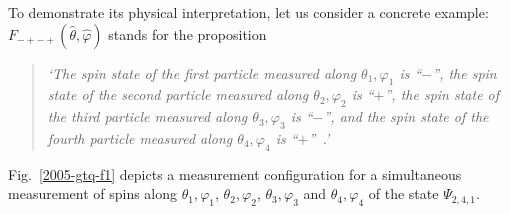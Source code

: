 \documentclass[pra,amsfonts,showpacs,showkeys,preprint]{revtex4}
\begin{document}
To demonstrate its physical interpretation, let us consider a concrete example: $F_{- + - + } ({\hat \theta},{\hat \varphi} )$ stands for the proposition
\begin{quote}
{\em `The spin state of the first particle measured along $\theta_1,\varphi_1$ is ``$-$'',
      the spin state of the second particle measured along $\theta_2,\varphi_2$ is ``$+$'',
      the spin state of the third particle measured along $\theta_3,\varphi_3$ is ``$-$'',
      and the spin state of the fourth particle measured along $\theta_4,\varphi_4$ is ``$+$''~.'
}
\end{quote}
Fig.~\ref{2005-gtq-f1} depicts a measurement configuration
for a simultaneous measurement of spins along
$\theta_1,\varphi_1 $,
$\theta_2,\varphi_2 $,
$\theta_3,\varphi_3 $ and
$\theta_4,\varphi_4 $
of the state $\Psi_{2,4,1}$.
\begin{figure}[htbp]
\begin{center}


\end{center}
\end{figure}
\end{document}

